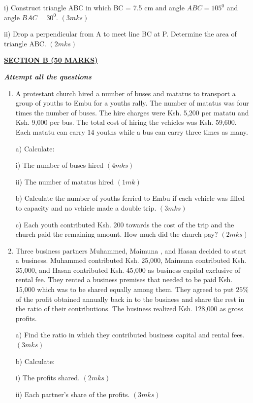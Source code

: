 \documentclass[
  a4paperpaper,
]{scrbook}
\begin{document}
\begin{tcolorbox}
\begin{enumerate}
  i) Construct triangle ABC in which BC = 7.5 cm and angle
  \(ABC = 105^0\) and angle \(BAC = 30^0\). \((3mks)\)

  ii) Drop a perpendicular from A to meet line BC at P. Determine the
  area of triangle ABC. \((2mks)\)
\end{enumerate}

\ul{\textbf{SECTION B (50 MARKS)}}

\textbf{\emph{Attempt all the questions}}

\begin{enumerate}
\def\labelenumi{\arabic{enumi}.}
\setcounter{enumi}{16}
\item
  A protestant church hired a number of buses and matatus to transport a
  group of youths to Embu for a youths rally. The number of matatus was
  four times the number of buses. The hire charges were Ksh. 5,200 per
  matatu and Ksh. 9,000 per bus. The total cost of hiring the vehicles
  was Ksh. 59,600. Each matatu can carry 14 youths while a bus can carry
  three times as many.

  a) Calculate:

  i) The number of buses hired \((4mks)\)

  ii) The number of matatus hired \((1mk)\)

  b) Calculate the number of youths ferried to Embu if each vehicle was
  filled to capacity and no vehicle made a double trip. \((3mks)\)

  c) Each youth contributed Ksh. 200 towards the cost of the trip and
  the church paid the remaining amount. How much did the church pay?
  \((2mks)\)
\item
  Three business partners Muhammed, Maimuna , and Hasan decided to start
  a business. Muhammed contributed Ksh. 25,000, Maimuna contributed Ksh.
  35,000, and Hasan contributed Ksh. 45,000 as business capital
  exclusive of rental fee. They rented a business premises that needed
  to be paid Ksh. 15,000 which was to be shared equally among them. They
  agreed to put \(25\%\) of the profit obtained annually back in to the
  business and share the rest in the ratio of their contributions. The
  business realized Ksh. 128,000 as gross profits.

  a) Find the ratio in which they contributed business capital and
  rental fees. \((3mks)\)

  b) Calculate:

  i) The profits shared. \((2mks)\)

  ii) Each partner's share of the profits. \((3mks)\)


\end{enumerate}
\end{tcolorbox}
\end{document}
